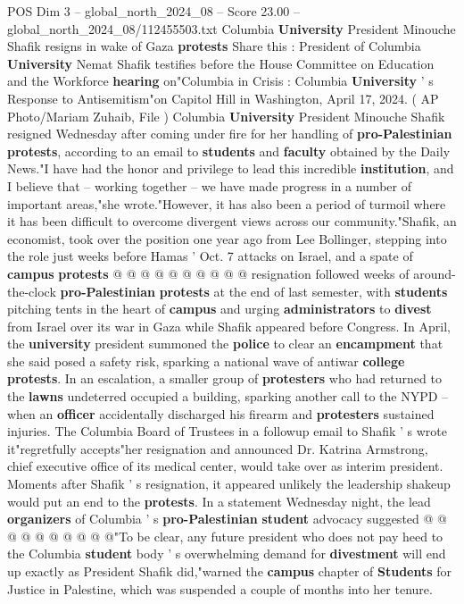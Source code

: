 \begin{textsample}{POS Dim 3 – global\_north\_2024\_08 – Score 23.00 – global\_north\_2024\_08/112455503.txt}  \label{ex:f3_pos_134}
Columbia \textbf{University} President Minouche Shafik resigns in wake of Gaza \textbf{protests} Share this : President of Columbia \textbf{University} Nemat Shafik testifies before the House Committee on Education and the Workforce \textbf{hearing} on"Columbia in Crisis : Columbia \textbf{University} ' s Response to Antisemitism"on Capitol Hill in Washington, April 17, 2024. ( AP Photo/Mariam Zuhaib, File ) Columbia \textbf{University} President Minouche Shafik resigned Wednesday after coming under fire for her handling of \textbf{pro-Palestinian} \textbf{protests}, according to an email to \textbf{students} and \textbf{faculty} obtained by the Daily News."I have had the honor and privilege to lead this incredible \textbf{institution}, and I believe that -- working together -- we have made progress in a number of important areas,"she wrote."However, it has also been a period of turmoil where it has been difficult to overcome divergent views across our community."Shafik, an economist, took over the position one year ago from Lee Bollinger, stepping into the role just weeks before Hamas ' Oct. 7 attacks on Israel, and a spate of \textbf{campus} \textbf{protests} @ @ @ @ @ @ @ @ @ @ resignation followed weeks of around-the-clock \textbf{pro-Palestinian} \textbf{protests} at the end of last semester, with \textbf{students} pitching tents in the heart of \textbf{campus} and urging \textbf{administrators} to \textbf{divest} from Israel over its war in Gaza while Shafik appeared before Congress.
In April, the \textbf{university} president summoned the \textbf{police} to clear an \textbf{encampment} that she said posed a safety risk, sparking a national wave of antiwar \textbf{college} \textbf{protests}.
In an escalation, a smaller group of \textbf{protesters} who had returned to the \textbf{lawns} undeterred occupied a building, sparking another call to the NYPD -- when an \textbf{officer} accidentally discharged his firearm and \textbf{protesters} sustained injuries.
The Columbia Board of Trustees in a followup email to Shafik ' s wrote it"regretfully accepts"her resignation and announced Dr.
Katrina Armstrong, chief executive office of its medical center, would take over as interim president.
Moments after Shafik ' s resignation, it appeared unlikely the leadership shakeup would put an end to the \textbf{protests}.
In a statement Wednesday night, the lead \textbf{organizers} of Columbia ' s \textbf{pro-Palestinian} \textbf{student} advocacy suggested @ @ @ @ @ @ @ @ @ @"To be clear, any future president who does not pay heed to the Columbia \textbf{student} body ' s overwhelming demand for \textbf{divestment} will end up exactly as President Shafik did,"warned the \textbf{campus} chapter of \textbf{Students} for Justice in Palestine, which was suspended a couple of months into her tenure.

\end{textsample}

